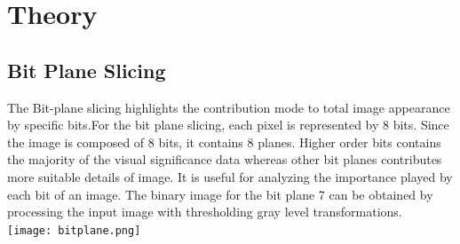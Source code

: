 \documentclass[12pt]{article}
\begin{document}
\section{Theory}
\subsection{Bit Plane Slicing}
The Bit-plane slicing highlights the contribution mode to total image appearance by specific bits.For the bit plane slicing, each pixel is represented by 8 bits. Since the image is composed of 8 bits, it contains 8 planes. Higher order bits contains the majority of the visual significance data whereas other bit planes contributes more suitable details of image. It is useful for analyzing the importance played by each bit of an image. The binary image for the bit plane 7 can be obtained by processing the input image with thresholding gray level transformations.\\
\texttt{[image: bitplane.png]}\\
\end{document}
